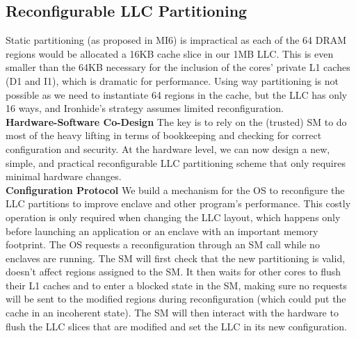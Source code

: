 \subsection{Reconfigurable LLC Partitioning}
\label{app:dynamiccache}
Static partitioning (as proposed in MI6) is impractical as each of the 64 DRAM regions would be allocated a 16KB cache slice in our 1MB LLC.
This is even smaller than the 64KB necessary for the inclusion of the cores' private L1 caches (D1 and I1), which is dramatic for performance.
Using way partitioning \cite{kiriansky2018dawg} is not possible as we need to instantiate 64 regions in the cache, but the LLC has only 16 ways, and Ironhide's \cite{ironhide} strategy assumes limited reconfiguration.
\\

\noindent\textbf{Hardware-Software Co-Design}
The key is to rely on the (trusted) SM to do most of the heavy lifting in terms of bookkeeping and checking for correct configuration and security.
At the hardware level, we can now design a new, simple, and practical reconfigurable LLC partitioning scheme that only requires minimal hardware changes.
\\

\noindent\textbf{Configuration Protocol}
We build a mechanism for the OS to reconfigure the LLC partitions to improve enclave and other program's performance.
This costly operation is only required when changing the LLC layout, which happens only before launching an application or an enclave with an important memory footprint.
The OS requests a reconfiguration through an SM call while no enclaves are running.
The SM will first check that the new partitioning is valid, doesn't affect regions assigned to the SM.
It then waits for other cores to flush their L1 caches and to enter a blocked state in the SM, making sure no requests will be sent to the modified regions during reconfiguration (which could put the cache in an incoherent state).
The SM will then interact with the hardware to flush the LLC slices that are modified and set the LLC in its new configuration.
\\

